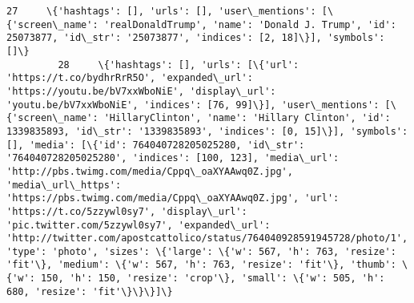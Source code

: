 \documentclass[11pt]{article}
\begin{document}
\begin{Verbatim}[commandchars=\\\{\}]
         27     \{'hashtags': [], 'urls': [], 'user\_mentions': [\{'screen\_name': 'realDonaldTrump', 'name': 'Donald J. Trump', 'id': 25073877, 'id\_str': '25073877', 'indices': [2, 18]\}], 'symbols': []\}                                                                                                                                                                                                                                                                                                                                                                                                                                                                                                                                                                                                                                                                                                                                                                                                                                                                                                                                                                                                                        
         28     \{'hashtags': [], 'urls': [\{'url': 'https://t.co/bydhrRrR5O', 'expanded\_url': 'https://youtu.be/bV7xxWboNiE', 'display\_url': 'youtu.be/bV7xxWboNiE', 'indices': [76, 99]\}], 'user\_mentions': [\{'screen\_name': 'HillaryClinton', 'name': 'Hillary Clinton', 'id': 1339835893, 'id\_str': '1339835893', 'indices': [0, 15]\}], 'symbols': [], 'media': [\{'id': 764040728205025280, 'id\_str': '764040728205025280', 'indices': [100, 123], 'media\_url': 'http://pbs.twimg.com/media/Cppq\_oaXYAAwq0Z.jpg', 'media\_url\_https': 'https://pbs.twimg.com/media/Cppq\_oaXYAAwq0Z.jpg', 'url': 'https://t.co/5zzywl0sy7', 'display\_url': 'pic.twitter.com/5zzywl0sy7', 'expanded\_url': 'http://twitter.com/apostcattolico/status/764040928591945728/photo/1', 'type': 'photo', 'sizes': \{'large': \{'w': 567, 'h': 763, 'resize': 'fit'\}, 'medium': \{'w': 567, 'h': 763, 'resize': 'fit'\}, 'thumb': \{'w': 150, 'h': 150, 'resize': 'crop'\}, 'small': \{'w': 505, 'h': 680, 'resize': 'fit'\}\}\}]\}                                                                                                                                                                                                                                

\end{Verbatim}
\end{document}

